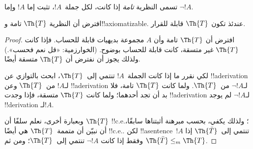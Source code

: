 \documentclass[../../../include/open-logic-section]{subfiles}
\begin{document}


تسمى النظرية {\em تامة} إذا كانت، لكل جملة~$!A$، تثبت إما $!A$
وإما $\lnot !A$.

\begin{lem}
افترض أن النظرية $\Th{T}$ تامة و!!{axiomatizable}. عندئذ تكون
$\Th{T}$ قابلة للقرار.
\end{lem}

\begin{proof}
افترض أن $\Th{T}$ تامة وأن $A$ مجموعة بديهيات قابلة للحساب. فإذا
كانت $\Th{T}$ غير متسقة، كانت قابلة للحساب بوضوح. (الخوارزمية: «قل
نعم فحسب».) ولذلك يجوز أن نفترض أن $\Th{T}$ متسقة أيضًا.

لكي نقرر ما إذا كانت الجملة~$!A$ تنتمي إلى~$\Th{T}$، ابحث بالتوازي
عن !!a{derivation} لـ$!A$ من~$\Th{T}$ وعن !!a{derivation} لـ$\lnot
!A$ من~$\Th{T}$. ولما كانت $\Th{T}$ تامة، فلا بد أن تجد أحدهما؛ ولما كانت
$\Th{T}$ متسقة، فإذا وجدت !!a{derivation} لـ$\lnot !A$ لم يوجد
!!{derivation} لـ$!A$.

وبعبارة أخرى، نعلم سلفًا أن $\Th{T}$ !!{c.e.}؛ ولذلك يكفي، بحسب
مبرهنة أثبتناها سابقًا، أن نبيّن أن متممة~$\Th{T}$ هي أيضًا
!!{c.e.}. لكن !!a{sentence}~$!A$ تنتمي إلى~$\Th{\bar T}$ إذا وفقط
إذا كانت $\lnot !A$ تنتمي إلى~$\Th{T}$؛ ومن ثم
$\Th{\bar T}\leq_m\Th{T}$.
\end{proof}
\end{document}

